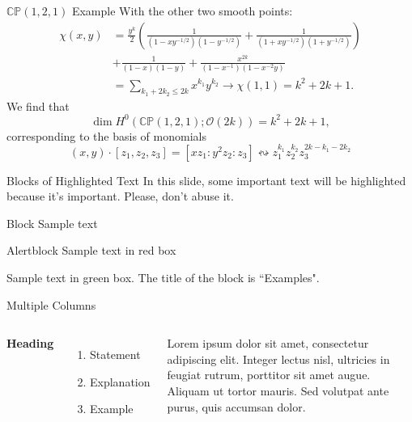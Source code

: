\documentclass[aspectratio=169,xcolor=dvipsnames]{beamer}
\newcommand{\CC}{\mathbb{C}}
\newcommand{\PP}{\mathbb{P}}
\newcommand{\mc}[1]{\mathcal{#1}}
\begin{document}
\begin{frame}{$\CC\PP(1,2,1)$ Example}
    With the other two smooth points:
    \begin{align*}
        \chi(x,y) &= \frac{y^{k}}{2}\left( \frac{1}{(1 - xy^{-1/2})(1 - y^{-1/2})} + \frac{1}{(1 + xy^{-1/2})(1 + y^{-1/2})} \right) \\
        &+ \frac{1}{(1-x)(1-y)} + \frac{x^{2k}}{(1-x^{-1})(1 - x^{-2}y) } \\
        &= \sum_{k_{1} + 2k_{2} \leq 2k} x^{k_{1}}y^{k_{2}} \longrightarrow \chi(1,1) = k^{2} + 2k + 1.
    \end{align*}
    We find that
    \[
        \dim H^{0}(\CC\PP(1,2,1) ; \mc{O}(2k)) = k^{2} + 2k + 1,
    \]
    corresponding to the basis of monomials
    \[
        (x,y) \cdot [z_{1}, z_{2}, z_{3}] = [xz_{1} : y^{2}z_{2}:z_{3}]  \leftrightsquigarrow z_{1}^{k_{1}}z_{2}^{k_{2}}z_{3}^{2k - k_{1} - 2k_{2}}
    \]
\end{frame}


\begin{frame}{Blocks of Highlighted Text}
    In this slide, some important text will be \alert{highlighted} because it's important. Please, don't abuse it.

    \begin{block}{Block}
        Sample text
    \end{block}

    \begin{alertblock}{Alertblock}
        Sample text in red box
    \end{alertblock}

    \begin{examples}
        Sample text in green box. The title of the block is ``Examples".
    \end{examples}
\end{frame}


\begin{frame}{Multiple Columns}
    \begin{columns}[c] %

        \textbf{Heading}
        \begin{enumerate}
            \item Statement
            \item Explanation
            \item Example
        \end{enumerate}

        Lorem ipsum dolor sit amet, consectetur adipiscing elit. Integer lectus nisl, ultricies in feugiat rutrum, porttitor sit amet augue. Aliquam ut tortor mauris. Sed volutpat ante purus, quis accumsan dolor.

    \end{columns}
\end{frame}
\end{document}
